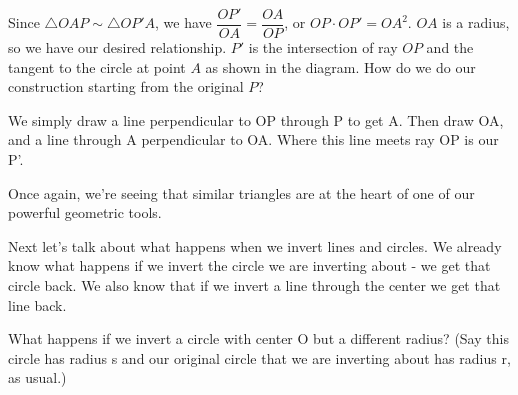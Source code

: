




Since $\triangle OAP \sim \triangle OP'A$, we have $\dfrac{OP'}{OA} = \dfrac{OA}{OP}$, or $OP \cdot OP' = OA^2$.  $OA$ is a radius, so we have our desired relationship.  $P'$ is the intersection of ray $OP$ and the tangent to the circle at point $A$ as shown in the diagram.  How do we do our construction starting from the original $P$?


We simply draw a line perpendicular to OP through P to get A.  Then draw OA, and a line through A perpendicular to OA.  Where this line meets ray OP is our P'.

Once again, we're seeing that similar triangles are at the heart of one of our powerful geometric tools.

Next let's talk about what happens when we invert lines and circles.  We already know what happens if we invert the circle we are inverting about - we get that circle back.  We also know that if we invert a line through the center we get that line back.

What happens if we invert a circle with center O but a different radius?  (Say this circle has radius s and our original circle that we are inverting about has radius r, as usual.)

